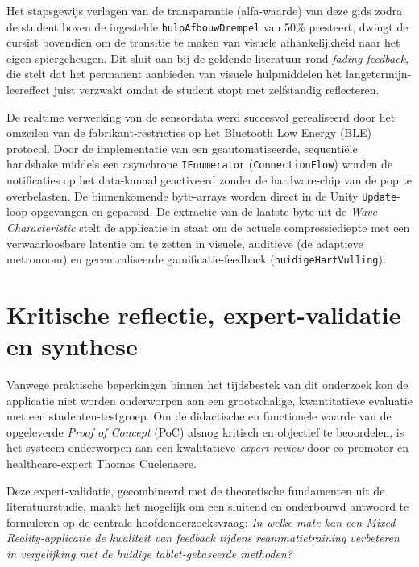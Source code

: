 Het stapsgewijs verlagen van de transparantie (alfa-waarde) van deze gids zodra de student boven de ingestelde \texttt{hulpAfbouwDrempel} 
van 50\% presteert, dwingt de cursist bovendien om de transitie te maken van visuele afhankelijkheid naar het eigen spiergeheugen. 
Dit sluit aan bij de geldende literatuur rond \textit{fading feedback}, die stelt dat het permanent aanbieden van visuele hulpmiddelen 
het langetermijn-leereffect juist verzwakt omdat de student stopt met zelfstandig reflecteren.

De realtime verwerking van de sensordata werd succesvol gerealiseerd door het omzeilen van de fabrikant-restricties op het 
Bluetooth Low Energy (BLE) protocol. Door de implementatie van een geautomatiseerde, sequentiële handshake middels een asynchrone 
\texttt{IEnumerator} (\texttt{ConnectionFlow}) worden de notificaties op het data-kanaal geactiveerd zonder de hardware-chip van de pop 
te overbelasten. De binnenkomende byte-arrays worden direct in de Unity \texttt{Update}-loop opgevangen en geparsed. De extractie van de 
laatste byte uit de \textit{Wave Characteristic} stelt de applicatie in staat om de actuele compressiediepte met een verwaarloosbare latentie 
om te zetten in visuele, auditieve (de adaptieve metronoom) en gecentraliseerde gamificatie-feedback (\texttt{huidigeHartVulling}).

\section{Kritische reflectie, expert-validatie en synthese}
\label{sec:validatie_synthese}

Vanwege praktische beperkingen binnen het tijdsbestek van dit onderzoek kon de applicatie niet worden onderworpen aan een grootschalige, 
kwantitatieve evaluatie met een studenten-testgroep. Om de didactische en functionele waarde van de 
opgeleverde \textit{Proof of Concept} (PoC) alsnog kritisch en objectief te beoordelen, is het systeem onderworpen aan een kwalitatieve \textit{expert-review} door 
co-promotor en healthcare-expert Thomas Cuelenaere. 

Deze expert-validatie, gecombineerd met de theoretische fundamenten uit de literatuurstudie, maakt het mogelijk om een sluitend en onderbouwd antwoord te 
formuleren op de centrale hoofdonderzoeksvraag: \textit{In welke mate kan een Mixed Reality-applicatie de kwaliteit van feedback tijdens reanimatietraining 
verbeteren in vergelijking met de huidige tablet-gebaseerde methoden?}

